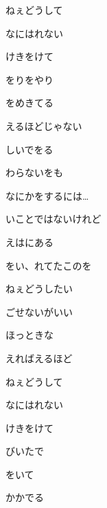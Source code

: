 \documentclass[a4paper,tate,twocolumn,12pt]{ltjtarticle}
\begin{document}
\begin{flushleft}
\begin{minipage}{\linewidth}
ねぇどうして

なにはれない

けきをけて
\end{minipage}

\vspace{2em}

\noindent\begin{minipage}{\linewidth}
をりをやり

をめきてる

えるほどじゃない

しいでをる

わらないをも

なにかをするには…

いことではないけれど

えはにある

をい、れてたこのを
\end{minipage}

\vspace{2em}

\noindent\begin{minipage}{\linewidth}
ねぇどうしたい

ごせないがいい

ほっときな

えればえるほど

ねぇどうして

なにはれない

けきをけて
\end{minipage}

\vspace{2em}

\noindent\begin{minipage}{\linewidth}
びいたで

をいて

かかでる


\end{minipage}
\end{flushleft}
\end{document}
